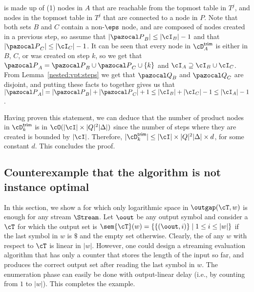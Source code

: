 is made up of (1) nodes in $A$ that are reachable from the topmost table in $T^j$, and nodes in the topmost table in $T^j$ that are connected to a node in $P$. Note that both sets $B$ and $C$ contain a non-$\eps$ node, and are composed of nodes created in a previous step, so assume that $|{\pazocal P}_B| \leq |\cI_B| -1$ and that $|{\pazocal P}_C| \leq |\cI_C| -1$. It can be seen that every node in $\cD^{\textsf{trim}}_A$ is either in $B$, $C$, or was created on step $k$, so we get that ${\pazocal P}_A = {\pazocal P}_B \cup {\pazocal P}_C \cup \{k\}$ and $\cI_A \supseteq \cI_B \cup \cI_C$. From Lemma~\ref{nested:vpt:steps} we get that ${\pazocal Q}_B$ and ${\pazocal Q}_C$ are disjoint, and putting these facts to together gives us that $| {\pazocal P}_A | =  |{\pazocal P}_B| + |{\pazocal P}_C| + 1\leq |\cI_B| + |\cI_C| - 1 \leq |\cI_A|-1$.

Having proven this statement, we can deduce that the number of product nodes in $\cD^{\textsf{trim}}_k$ is in $\cO(| \cI | \times |Q|^2|\Delta|)$ since the number of steps where they are created is bounded by $|\cI|$. Therefore, $| \cD^{\textsf{trim}}_k | \leq | \cI | \times |Q|^2|\Delta| \times d$, for some constant $d$. This concludes the proof.

\subsection{Counterexample that the algorithm is not instance optimal}
In this section, we show a \vpt for which only logarithmic space in $\outgap(\cT,w)$ is enough for any stream $\Stream$. Let $\oout$ be any output symbol and consider a \vpt $\cT$ for which the output set is $\sem{\cT}(w)  = \{\{(\oout, i)\}\mid 1\leq i\leq \vert w \vert \}$ if the last symbol in $w$ is $\$$ and the empty set otherwise. Clearly, the \ogapname of any $w$ with respect to $\cT$ is linear in $\vert w\vert$. However, one could design a streaming evaluation algorithm that has only a counter that stores the length of the input so far, and produces the correct output set after reading the last symbol in $w$. The enumeration phase can easily be done with output-linear delay (i.e., by counting from $1$ to $\vert w\vert$). This completes the example.